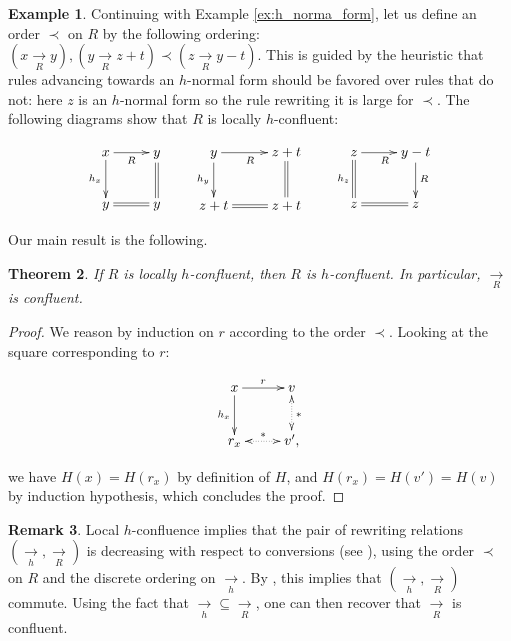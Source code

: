 \documentclass[10pt]{easychair}
\newtheorem{theorem}{Theorem}[section]
\theoremstyle{definition}
\newtheorem{remark}[theorem]{Remark}
\newtheorem{example}[theorem]{Example}
\newcommand\rewR{\underset{R}{\longrightarrow}}
\newcommand\rewh{\underset{h}{\longrightarrow}}
\begin{document}
\begin{example}
  Continuing with Example \ref{ex:h_norma_form}, let us define an order $\prec$ on $R$ by the following ordering: $(x \rewR y), (y \rewR z + t) \prec (z \rewR y - t)$. This is guided by the heuristic that rules advancing towards an $h$-normal form should be favored over rules that do not: here $z$ is an $h$-normal form so the rule rewriting it is large for $\prec$. The following diagrams show that $R$ is locally $h$-confluent:
  \begin{small}
    \[
    \xymatrix @C = 2.5em @R = 2.5em{
      x \ar [r] _{R}  
      \ar [d] _{h_x}   
      & y 
      \ar@{=} [d]
      \\
      y
      \ar@{=} [r]
      & y
    }
    \qquad
    \xymatrix @C = 2.5em @R = 2.5em{
      y \ar [r] _{R}  
      \ar [d] _{h_y}   
      & z + t
      \ar@{=} [d]
      \\
      z + t
      \ar@{=} [r]
      & z + t
    }
    \qquad
    \xymatrix @C = 2.5em @R = 2.5em{
      z \ar [r] _{R}  
      \ar@{=} [d] _{h_z}   
      & y - t
      \ar [d] ^{R}
      \\
      z
      \ar@{=} [r]
      & z
    }
    \]
  \end{small}
\end{example}
\medskip

Our main result is the following.
\smallskip

\begin{theorem}\label{thm:confluence_criterion}
  If $R$ is locally $h$-confluent, then $R$ is $h$-confluent. In particular, $\rewR$ is confluent.
\end{theorem}

\begin{proof}
  We reason by induction on $r$ according to the order $\prec$. Looking at the square corresponding to $r$:
  \begin{small}
    \[
    \xymatrix @C = 2.5em @R = 2.5em{
      x 
      \ar [r] ^{r}
      \ar[d] _{h_x}
      &
      v
      \ar@{<.>} [d] ^{*}
      \\
      r_x
      \ar@{<.>} [r] ^{*}
      & 
      v',
    }
    \]
  \end{small}
 we have $H(x) = H(r_x)$ by definition of $H$, and $H(r_x) = H(v') = H(v)$ by induction hypothesis, which concludes the proof.
\end{proof}

\begin{remark}
  Local $h$-confluence implies that the pair of rewriting relations $(\rewh,\rewR)$ is decreasing with respect to conversions (see \cite[Definition 3]{van2008confluence}), using the order $\prec$ on $R$ and the discrete ordering on $\rewh$. 
  By \cite[Theorem 3]{van2008confluence}, this implies that $(\rewh,\rewR)$ commute. Using the fact that $\rewh \subseteq \rewR$, one can then recover that $\rewR$ is confluent.
\end{remark}
\end{document}
